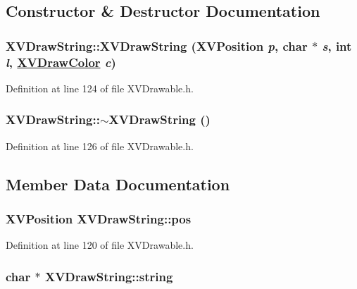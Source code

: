 \subsection{Constructor \& Destructor Documentation}
\label{XVDrawString_a0}
\hypertarget{class_XVDrawString_a0}{
\subsubsection[XVDrawString]{\setlength{\rightskip}{0pt plus 5cm}XVDraw\-String::XVDraw\-String (XVPosition {\em p}, char $\ast$ {\em s}, int {\em l}, \hyperlink{class_XVDrawColor}{XVDraw\-Color} {\em c})}}




Definition at line 124 of file XVDrawable.h.\label{XVDrawString_a1}
\hypertarget{class_XVDrawString_a1}{
\subsubsection[~XVDrawString]{\setlength{\rightskip}{0pt plus 5cm}XVDraw\-String::$\sim$XVDraw\-String ()}}




Definition at line 126 of file XVDrawable.h.

\subsection{Member Data Documentation}
\label{XVDrawString_m0}
\hypertarget{class_XVDrawString_m0}{
\subsubsection[pos]{\setlength{\rightskip}{0pt plus 5cm}XVPosition XVDraw\-String::pos}}




Definition at line 120 of file XVDrawable.h.\label{XVDrawString_m1}
\hypertarget{class_XVDrawString_m1}{
\subsubsection[string]{\setlength{\rightskip}{0pt plus 5cm}char $\ast$ XVDraw\-String::string}}





